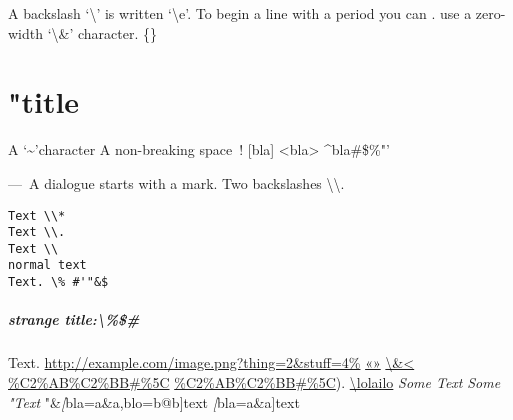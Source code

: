 A backslash `\textbackslash{}' is written `\textbackslash{}e'. To begin a line with a period you can
. use a zero-width `\textbackslash{}\&' character. \{\}

\chapter{"title}
\label{s:1}
A `\~{}'character
A non-breaking space~!
[bla]
<bla>
\^{}bla\#\$\%"’

—~A dialogue starts with a mark.
Two backslashes \textbackslash{}\textbackslash{}.

\begin{verbatim}
Text \\*
Text \\.
Text \\
normal text
Text. \% #'"&$
\end{verbatim}

\paragraph{strange title:\textbackslash{}\%\$\#}
Text.
\url{http://example.com/image.png?thing=2&stuff=4\%}
\href{example.com/image-\%C2\%AB\%C2\%BB.png}{«»}
\href{https://example.com/image.png?thing=3}{\textbackslash{}\&<}
\url{\%C2\%AB\%C2\%BB#\%5C}
\url{\%C2\%AB\%C2\%BB#\%5C}).
\hyperref[s:1]{\textbackslash{}lolailo}
\emph{Some     Text}
\emph{Some     "Text}
"\&\emph[bla=a\&a,blo=b@b]{text}
\emph[bla=a\&a]{text}

